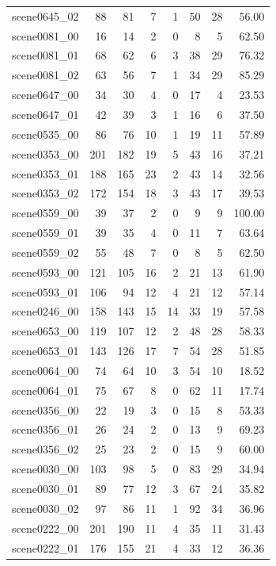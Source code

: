 \begin{table}[t]
\begin{tabular}{lrrrrrrr}
scene0645\_02 & 88 & 81 & 7 & 1 & 50 & 28 & 56.00 \\
scene0081\_00 & 16 & 14 & 2 & 0 & 8 & 5 & 62.50 \\
scene0081\_01 & 68 & 62 & 6 & 3 & 38 & 29 & 76.32 \\
scene0081\_02 & 63 & 56 & 7 & 1 & 34 & 29 & 85.29 \\
scene0647\_00 & 34 & 30 & 4 & 0 & 17 & 4 & 23.53 \\
scene0647\_01 & 42 & 39 & 3 & 1 & 16 & 6 & 37.50 \\
scene0535\_00 & 86 & 76 & 10 & 1 & 19 & 11 & 57.89 \\
scene0353\_00 & 201 & 182 & 19 & 5 & 43 & 16 & 37.21 \\
scene0353\_01 & 188 & 165 & 23 & 2 & 43 & 14 & 32.56 \\
scene0353\_02 & 172 & 154 & 18 & 3 & 43 & 17 & 39.53 \\
scene0559\_00 & 39 & 37 & 2 & 0 & 9 & 9 & 100.00 \\
scene0559\_01 & 39 & 35 & 4 & 0 & 11 & 7 & 63.64 \\
scene0559\_02 & 55 & 48 & 7 & 0 & 8 & 5 & 62.50 \\
scene0593\_00 & 121 & 105 & 16 & 2 & 21 & 13 & 61.90 \\
scene0593\_01 & 106 & 94 & 12 & 4 & 21 & 12 & 57.14 \\
scene0246\_00 & 158 & 143 & 15 & 14 & 33 & 19 & 57.58 \\
scene0653\_00 & 119 & 107 & 12 & 2 & 48 & 28 & 58.33 \\
scene0653\_01 & 143 & 126 & 17 & 7 & 54 & 28 & 51.85 \\
scene0064\_00 & 74 & 64 & 10 & 3 & 54 & 10 & 18.52 \\
scene0064\_01 & 75 & 67 & 8 & 0 & 62 & 11 & 17.74 \\
scene0356\_00 & 22 & 19 & 3 & 0 & 15 & 8 & 53.33 \\
scene0356\_01 & 26 & 24 & 2 & 0 & 13 & 9 & 69.23 \\
scene0356\_02 & 25 & 23 & 2 & 0 & 15 & 9 & 60.00 \\
scene0030\_00 & 103 & 98 & 5 & 0 & 83 & 29 & 34.94 \\
scene0030\_01 & 89 & 77 & 12 & 3 & 67 & 24 & 35.82 \\
scene0030\_02 & 97 & 86 & 11 & 1 & 92 & 34 & 36.96 \\
scene0222\_00 & 201 & 190 & 11 & 4 & 35 & 11 & 31.43 \\
scene0222\_01 & 176 & 155 & 21 & 4 & 33 & 12 & 36.36 \\

\end{tabular}
\end{table}

